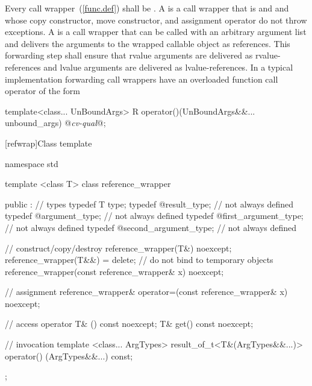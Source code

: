 \pnum
{}%
%
%
%
%
Every call wrapper~(\ref{func.def}) shall be
. A  is a call wrapper
that is  and  and whose copy
constructor, move constructor, and assignment operator
do not throw exceptions. A  is a
call wrapper that can be called with an arbitrary argument list
and delivers the arguments to the wrapped callable object as references.
This forwarding step shall ensure that rvalue arguments are delivered as rvalue-references
and lvalue arguments are delivered as lvalue-references.
\enternote In a typical implementation
forwarding call wrappers have an overloaded function call
operator of
the form

\begin{codeblock}
template<class... UnBoundArgs>
R operator()(UnBoundArgs&&... unbound_args) @\textit{cv-qual}@;
\end{codeblock}
\exitnote

[refwrap]{Class template }

%
%
%
%
\begin{codeblock}
namespace std {
  template <class T> class reference_wrapper {
  public :
    // types
    typedef T type;
    typedef @\seebelow@ result_type;               // not always defined
    typedef @\seebelow@ argument_type;             // not always defined
    typedef @\seebelow@ first_argument_type;       // not always defined
    typedef @\seebelow@ second_argument_type;      // not always defined

    // construct/copy/destroy
    reference_wrapper(T&) noexcept;
    reference_wrapper(T&&) = delete;     // do not bind to temporary objects
    reference_wrapper(const reference_wrapper& x) noexcept;

    // assignment
    reference_wrapper& operator=(const reference_wrapper& x) noexcept;

    // access
    operator T& () const noexcept;
    T& get() const noexcept;

    // invocation
    template <class... ArgTypes>
    result_of_t<T&(ArgTypes&&...)>
    operator() (ArgTypes&&...) const;
  };
}
\end{codeblock}

